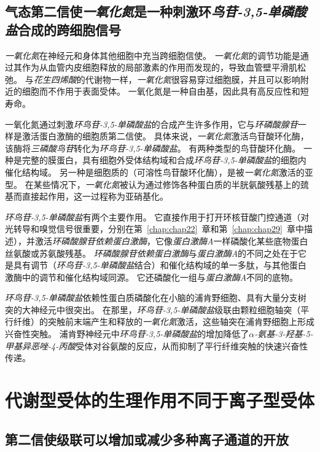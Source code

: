 \subsection{气态第二信使\textit{一氧化氮}是一种刺激环\textit{鸟苷-3,5-单磷酸盐}合成的跨细胞信号}

\textit{一氧化氮}在神经元和身体其他细胞中充当跨细胞信使。
\textit{一氧化氮}的调节功能是通过其作为从血管内皮细胞释放的局部激素的作用而发现的，导致血管壁平滑肌松弛。
与\textit{花生四烯酸}的代谢物一样，\textit{一氧化氮}很容易穿过细胞膜，并且可以影响附近的细胞而不作用于表面受体。
一氧化氮是一种自由基，因此具有高反应性和短寿命。


一氧化氮通过刺激\textit{环鸟苷-3,5-单磷酸盐}的合成产生许多作用，它与\textit{环磷酸腺苷}一样是激活蛋白激酶的细胞质第二信使。
具体来说，\textit{一氧化氮}激活鸟苷酸环化酶，该酶将\textit{三磷酸鸟苷}转化为\textit{环鸟苷-3,5-单磷酸盐}。
有两种类型的鸟苷酸环化酶。 
一种是完整的膜蛋白，具有细胞外受体结构域和合成\textit{环鸟苷-3,5-单磷酸盐}的细胞内催化结构域。
另一种是细胞质的（可溶性鸟苷酸环化酶），是被\textit{一氧化氮}激活的亚型。
在某些情况下，\textit{一氧化氮}被认为通过修饰各种蛋白质的半胱氨酸残基上的巯基而直接起作用，这一过程称为亚硝基化。


\textit{环鸟苷-3,5-单磷酸盐}有两个主要作用。
它直接作用于打开环核苷酸门控通道（对光转导和嗅觉信号很重要，分别在第~\ref{chap:chap22}~章和第~\ref{chap:chap29}~章中描述），并激活\textit{环磷酸腺苷依赖蛋白激酶}，它像\textit{蛋白激酶A}一样磷酸化某些底物蛋白 丝氨酸或苏氨酸残基。
\textit{环磷酸腺苷依赖蛋白激酶}与\textit{蛋白激酶A}的不同之处在于它是具有调节（\textit{环鸟苷-3,5-单磷酸盐}结合）和催化结构域的单一多肽，与其他蛋白激酶中的调节和催化结构域同源。
它还磷酸化一组与\textit{蛋白激酶A}不同的底物。


\textit{环鸟苷-3,5-单磷酸盐}依赖性蛋白质磷酸化在小脑的浦肯野细胞、具有大量分支树突的大神经元中很突出。
在那里，\textit{环鸟苷-3,5-单磷酸盐}级联由颗粒细胞轴突（平行纤维）的突触前末端产生和释放的\textit{一氧化氮}激活，这些轴突在浦肯野细胞上形成兴奋性突触。
浦肯野神经元中\textit{环鸟苷-3,5-单磷酸盐}的增加降低了\textit{$\alpha$-氨基-3-羟基-5-甲基异恶唑-4-丙酸}受体对谷氨酸的反应，从而抑制了平行纤维突触的快速兴奋性传递。



\section{代谢型受体的生理作用不同于离子型受体}

\subsection{第二信使级联可以增加或减少多种离子通道的开放}

